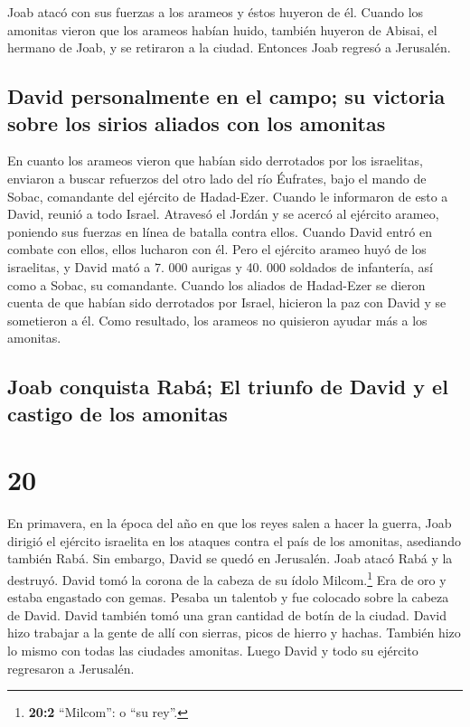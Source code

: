  Joab atacó con sus fuerzas a los arameos y éstos huyeron
de él.  Cuando los amonitas vieron que los arameos habían
huido, también huyeron de Abisai, el hermano de Joab, y se retiraron a
la ciudad. Entonces Joab regresó a Jerusalén.

\hypertarget{david-personalmente-en-el-campo-su-victoria-sobre-los-sirios-aliados-con-los-amonitas}{%
\subsection{David personalmente en el campo; su victoria sobre los
sirios aliados con los
amonitas}\label{david-personalmente-en-el-campo-su-victoria-sobre-los-sirios-aliados-con-los-amonitas}}

 En cuanto los arameos vieron que habían sido derrotados
por los israelitas, enviaron a buscar refuerzos del otro lado del río
Éufrates, bajo el mando de Sobac, comandante del ejército de Hadad-Ezer.
 Cuando le informaron de esto a David, reunió a todo
Israel. Atravesó el Jordán y se acercó al ejército arameo, poniendo sus
fuerzas en línea de batalla contra ellos. Cuando David entró en combate
con ellos, ellos lucharon con él.  Pero el ejército
arameo huyó de los israelitas, y David mató a 7. 000 aurigas y 40. 000
soldados de infantería, así como a Sobac, su comandante. 
Cuando los aliados de Hadad-Ezer se dieron cuenta de que habían sido
derrotados por Israel, hicieron la paz con David y se sometieron a él.
Como resultado, los arameos no quisieron ayudar más a los amonitas.

\hypertarget{joab-conquista-rabuxe1-el-triunfo-de-david-y-el-castigo-de-los-amonitas}{%
\subsection{Joab conquista Rabá; El triunfo de David y el castigo de los
amonitas}\label{joab-conquista-rabuxe1-el-triunfo-de-david-y-el-castigo-de-los-amonitas}}

\hypertarget{section-19}{%
\section{20}\label{section-19}}

 En primavera, en la época del año en que los reyes salen
a hacer la guerra, Joab dirigió el ejército israelita en los ataques
contra el país de los amonitas, asediando también Rabá. Sin embargo,
David se quedó en Jerusalén. Joab atacó Rabá y la destruyó.
 David tomó la corona de la cabeza de su ídolo
Milcom.\footnote{\textbf{20:2} ``Milcom'': o ``su rey''.} Era de oro y
estaba engastado con gemas. Pesaba un talentob y fue colocado sobre la
cabeza de David. David también tomó una gran cantidad de botín de la
ciudad.  David hizo trabajar a la gente de allí con
sierras, picos de hierro y hachas. También hizo lo mismo con todas las
ciudades amonitas. Luego David y todo su ejército regresaron a
Jerusalén.

